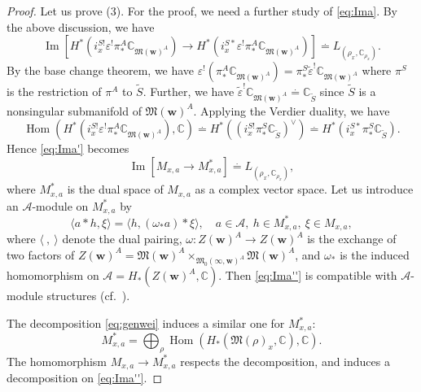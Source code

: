 \documentclass[12pt]{amsart}
\def\Bbb{\mathbb}
\def\frak{\mathfrak}
\theoremstyle{definition}
\theoremstyle{remark}
\numberwithin{equation}{subsection}
\newcommand{\C}{{\Bbb C}}
\newcommand{\Hom}{\operatorname{Hom}}
\newcommand{\Ima}{\operatorname{Im}}
\newcommand{\M}{{\frak M}} %
\newcommand{\bw}{{\mathbf w}} %
\newcommand{\Zw}{Z(\bw)}
\newcommand{\Mw}{\M(\bw)}
\newcommand{\ngpiso}{\overset{.}{=}}
\begin{document}
\begin{proof}
Let us prove (3).
%
For the proof, we need a further study of \eqref{eq:Ima}. By the above
discussion, we have
\begin{equation}\label{eq:Ima'}
      \Ima\left[
      H^*(i^{S!}_x \varepsilon^! \pi^A_* \C_{\M(\bw)^A})
    \to 
      H^*(i^{S*}_x \varepsilon^! \pi^A_* \C_{\M(\bw)^A})
    \right]
   \ngpiso L_{(\rho_x,\C_{\rho_x})}.
\end{equation}
By the base change theorem, we have 
\(
  \varepsilon^! \left(\pi^A_*\C_{\M(\bw)^A}\right)
   = \pi^S_* \widetilde\varepsilon^!\C_{\M(\bw)^A}
\)
 where $\pi^S$ is the restriction of
$\pi^A$ to $\widetilde S$. Further, we have
\(
   \widetilde\varepsilon^!\C_{\M(\bw)^A} \ngpiso \C_{\widetilde S}
\)
since $\widetilde S$ is a nonsingular submanifold of
$\M(\bw)^A$. Applying the Verdier duality, we have
\begin{equation*}
   \Hom\left(H^*(i^{S!}_x \varepsilon^! \pi^A_*\C_{\M(\bw)^A}),
     \C \right) 
  \ngpiso
   H^*((i^{S!}_x \pi^S_* \C_{\widetilde S})^\vee)
  \ngpiso
   H^*(i^{S*}_x \pi^S_* \C_{\widetilde S}).
\end{equation*}
Hence \eqref{eq:Ima'} becomes
\begin{equation}\label{eq:Ima''}
    \Ima\left[
      M_{x,a}
    \to 
      M_{x,a}^*
    \right]
   \ngpiso L_{(\rho_x,\C_{\rho_x})},
\end{equation}
where $M_{x,a}^*$ is the dual space of $M_{x,a}$ as a complex vector space.
%
Let us introduce an $\mathcal A$-module on $M_{x,a}^*$ by
\begin{equation*}
   \langle a \ast h, \xi\rangle 
    = \langle h, (\omega_* a)\ast \xi\rangle, \quad 
     a\in \mathcal A, \ h\in M_{x,a}^*, \ \xi\in M_{x,a},
\end{equation*}
where $\langle\ ,\ \rangle$ denote the dual pairing,
%
$\omega\colon \Zw^A\to \Zw^A$ is the exchange of two factors of
$\Zw^A = \Mw^A\times_{\M_0(\infty,\bw)^A}\Mw^A$,
%
and $\omega_*$ is the induced homomorphism on
$\mathcal A = H_*(\Zw^A,\C)$.
Then \eqref{eq:Ima''} is compatible with $\mathcal A$-module
structures (cf.\ \cite[paragraphs preceding 8.6.25]{Gi-book}).
%

The decomposition \eqref{eq:genwei} induces a similar one for
$M_{x,a}^*$:
\begin{equation*}
   M_{x,a}^* = \bigoplus_\rho \Hom(H_*(\M(\rho)_x,\C),\C).
\end{equation*}
The homomorphism $M_{x,a}\to M_{x,a}^*$ respects the decomposition,
and induces a decomposition on \eqref{eq:Ima''}.


\end{proof}
\end{document}
